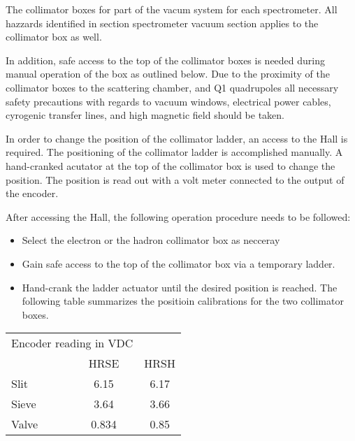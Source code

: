 The collimator boxes for part of the vacum system for each spectrometer. All hazzards
identified in section spectrometer vacuum section applies to the collimator box as well.

In addition, safe access to the top of
the collimator boxes is needed  during manual operation of the box as outlined below.
Due to the proximity of the collimator boxes to the scattering chamber, and Q1 quadrupoles
all necessary safety precautions with regards to vacuum windows, electrical power cables, 
cyrogenic transfer lines, and high magnetic field should be taken.

In order to change the  position of the collimator ladder, an access to the Hall is
required. The positioning of the collimator ladder is accomplished manually.
A hand-cranked acutator at the top of the collimator box is used to change the position.
The position is read out with a volt meter connected to the output of the encoder.

After accessing the Hall, the following operation procedure needs to be followed:
\begin{itemize}
\item[~] Select the electron or the hadron collimator box as necceray
\item[~] Gain safe access to the top of the collimator box via a temporary ladder.
\item[~] Hand-crank the  ladder actuator until the desired position is reached. The
following table summarizes the positioin calibrations for the two collimator boxes.
\end{itemize}
\begin{tabular}{|l | c| c|}
\hline
\multicolumn{2}{|c|}{Encoder reading in VDC} & \\
 & HRSE & HRSH \\
 \hline
 Slit & 6.15 & 6.17 \\ \hline
 Sieve & 3.64 & 3.66 \\ \hline
 Valve & 0.834 & 0.85 \\ 
 \hline
 \end{tabular}
\vfill\eject
